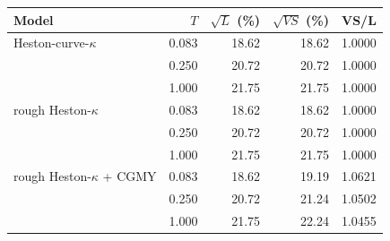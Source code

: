 \begin{tabular}{lrrrr}
\toprule
Model & $T$ & $\sqrt{L}$ (\%) & $\sqrt{VS}$ (\%) & VS/L\\
\midrule
Heston-curve-$\kappa$ & 0.083 & 18.62 & 18.62 & 1.0000\\
 & 0.250 & 20.72 & 20.72 & 1.0000\\
 & 1.000 & 21.75 & 21.75 & 1.0000\\
\addlinespace
rough Heston-$\kappa$ & 0.083 & 18.62 & 18.62 & 1.0000\\
 & 0.250 & 20.72 & 20.72 & 1.0000\\
 & 1.000 & 21.75 & 21.75 & 1.0000\\
\addlinespace
rough Heston-$\kappa$ + CGMY & 0.083 & 18.62 & 19.19 & 1.0621\\
 & 0.250 & 20.72 & 21.24 & 1.0502\\
 & 1.000 & 21.75 & 22.24 & 1.0455\\
\bottomrule
\end{tabular}
